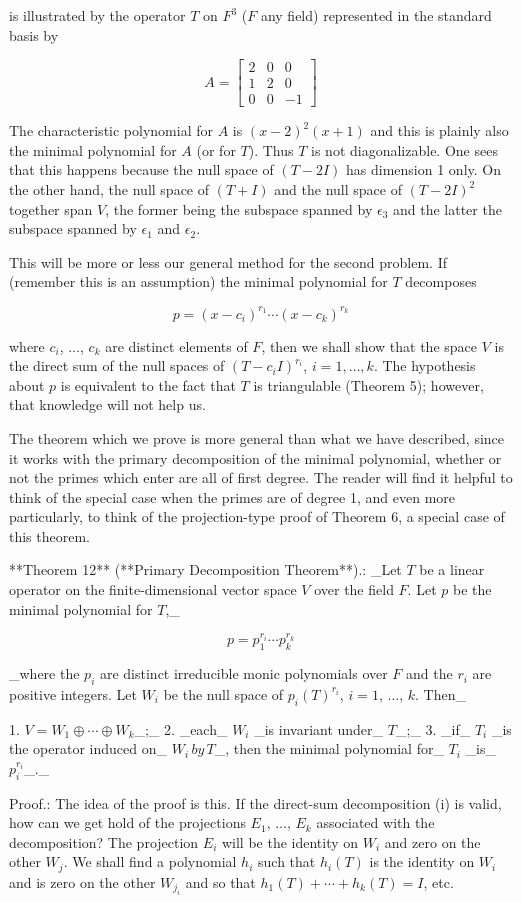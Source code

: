 is illustrated by the operator \(T\) on \(F^{3}\) (\(F\) any field) represented in the standard basis by

\[A=\begin{bmatrix}2&0&0\\ 1&2&0\\ 0&0&-1\end{bmatrix}\]

The characteristic polynomial for \(A\) is \((x-2)^{2}(x+1)\) and this is plainly also the minimal polynomial for \(A\) (or for \(T\)). Thus \(T\) is not diagonalizable. One sees that this happens because the null space of \((T-2I)\) has dimension 1 only. On the other hand, the null space of \((T+I)\) and the null space of \((T-2I)^{2}\) together span \(V\), the former being the subspace spanned by \(\epsilon_{3}\) and the latter the subspace spanned by \(\epsilon_{1}\) and \(\epsilon_{2}\).

This will be more or less our general method for the second problem. If (remember this is an assumption) the minimal polynomial for \(T\) decomposes

\[p=(x-c_{i})^{r_{1}}\cdots(x-c_{k})^{r_{k}}\]

where \(c_{i}\), \(\ldots\), \(c_{k}\) are distinct elements of \(F\), then we shall show that the space \(V\) is the direct sum of the null spaces of \((T-c_{i}I)^{r_{i}}\), \(i=1,\ldots,k\). The hypothesis about \(p\) is equivalent to the fact that \(T\) is triangulable (Theorem 5); however, that knowledge will not help us.

The theorem which we prove is more general than what we have described, since it works with the primary decomposition of the minimal polynomial, whether or not the primes which enter are all of first degree. The reader will find it helpful to think of the special case when the primes are of degree 1, and even more particularly, to think of the projection-type proof of Theorem 6, a special case of this theorem.

**Theorem 12** (**Primary Decomposition Theorem**).: _Let \(T\) be a linear operator on the finite-dimensional vector space \(V\) over the field \(F\). Let \(p\) be the minimal polynomial for \(T\),_

\[p=p_{1}^{r_{i}}\cdots p_{k}^{r_{k}}\]

_where the \(p_{i}\) are distinct irreducible monic polynomials over \(F\) and the \(r_{i}\) are positive integers. Let \(W_{i}\) be the null space of \(p_{i}(T)^{r_{i}}\), \(i=1\), \(\ldots\), \(k\). Then_

1. \(V=W_{1}\oplus\cdots\oplus W_{k}\)_;_
2. _each_ \(W_{i}\) _is invariant under_ \(T\)_;_
3. _if_ \(T_{i}\) _is the operator induced on_ \(W_{i}\,by\,T\)_, then the minimal polynomial for_ \(T_{i}\) _is_ \(p_{i}^{r_{i}}\)_._

Proof.: The idea of the proof is this. If the direct-sum decomposition (i) is valid, how can we get hold of the projections \(E_{1}\), \(\ldots\), \(E_{k}\) associated with the decomposition? The projection \(E_{i}\) will be the identity on \(W_{i}\) and zero on the other \(W_{j}\). We shall find a polynomial \(h_{i}\) such that \(h_{i}(T)\) is the identity on \(W_{i}\) and is zero on the other \(W_{j_{i}}\) and so that \(h_{1}(T)+\cdots+h_{k}(T)=I\), etc.

 